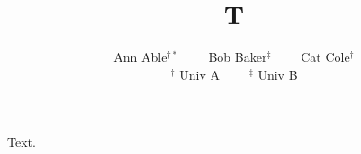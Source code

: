 \documentclass{article}
\title{T}
\author{Ann Able$^{\dagger*}$ \ \ \ \ Bob Baker$^{\ddagger}$ \ \ \ \ Cat Cole$^{\dagger}$ \\ $^\dagger$ Univ A \ \ \ \ $^\ddagger$ Univ B}
\begin{document}
\maketitle
Text.
\end{document}
